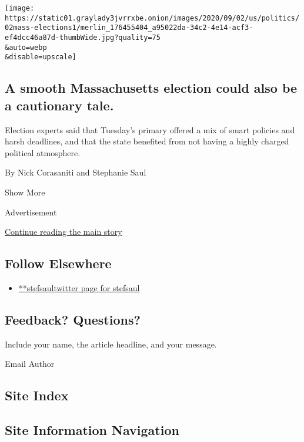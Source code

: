 \begin{enumerate}
  \texttt{[image: https://static01.graylady3jvrrxbe.onion/images/2020/09/02/us/politics/02mass-elections1/merlin\_176455404\_a95022da-34c2-4e14-acf3-ef4dcc46a87d-thumbWide.jpg?quality=75\\\&auto=webp\\\&disable=upscale]}

  \hypertarget{a-smooth-massachusetts-election-could-also-be-a-cautionary-tale}{%
  \subsection{A smooth Massachusetts election could also be a cautionary
  tale.}\label{a-smooth-massachusetts-election-could-also-be-a-cautionary-tale}}

  Election experts said that Tuesday's primary offered a mix of smart
  policies and harsh deadlines, and that the state benefited from not
  having a highly charged political atmosphere.

  By Nick Corasaniti and Stephanie Saul
\end{enumerate}

Show More

Advertisement

\protect\hyperlink{after-mid2}{Continue reading the main story}

\hypertarget{follow-elsewhere}{%
\subsection{Follow Elsewhere}\label{follow-elsewhere}}

\begin{itemize}
\tightlist
\item
  \href{https://twitter.com/stefsaul}{**stefsaultwitter page for
  stefsaul}
\end{itemize}

\hypertarget{feedback-questions}{%
\subsection{Feedback? Questions?}\label{feedback-questions}}

Include your name, the article headline, and your message.

Email Author

\hypertarget{site-index}{%
\subsection{Site Index}\label{site-index}}

\hypertarget{site-information-navigation}{%
\subsection{Site Information
Navigation}\label{site-information-navigation}}

